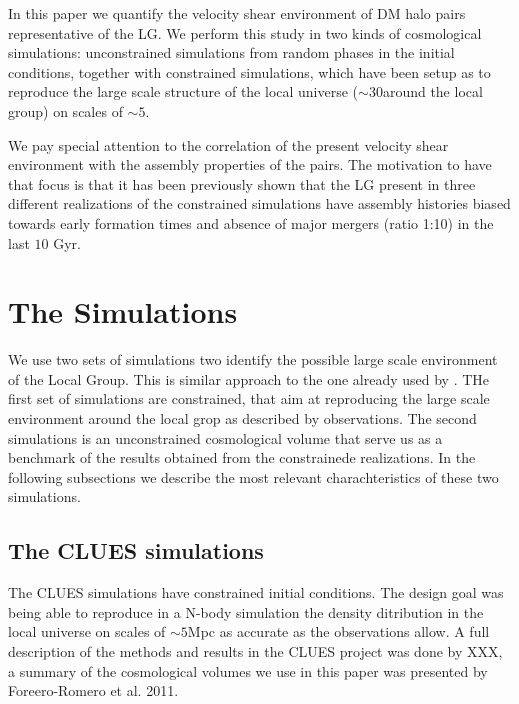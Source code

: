 \documentclass[usenatbib]{mn2e}
\newcommand{\hMpc}{{\ifmmode{h^{-1}{\rm Mpc}}\else{$h^{-1}$Mpc }\fi}}
\begin{document}
In this paper we quantify the velocity shear environment of DM halo pairs representative of the LG. 
We perform this study in two kinds of cosmological simulations: unconstrained simulations from random 
phases in the initial conditions, together with constrained simulations, which have been setup as to 
reproduce the large scale structure of the local universe ($\sim 30$\hMpc around the local group) on 
scales of $\sim 5$\hMpc. 

We pay special attention to the correlation of the present velocity shear environment with the assembly 
properties of the pairs. The motivation to have that focus is that it has been previously shown that 
the LG present in three different realizations of the constrained simulations have assembly histories
biased towards early formation times and absence of major mergers (ratio 1:10) in the last $10$ Gyr.

\section{The Simulations}
\label{sec:the_simulations}

We use two sets of simulations two identify the possible large scale environment of the Local Group. 
This is  similar approach to the one already used by . THe first set of simulations are constrained,
that aim at reproducing the large scale environment around the local grop as described by observations.
The second simulations is an unconstrained cosmological volume that serve us as a benchmark of the 
results obtained from the constrainede realizations. In the following subsections we describe the most 
relevant charachteristics of these two simulations.

\subsection{The CLUES simulations}
\label{subsec:CLUES_simulations}

The CLUES simulations have constrained initial conditions. The design goal was being able to reproduce
in a N-body simulation the density ditribution in the local universe on scales of $\sim5$Mpc as accurate
as the observations allow. A full description of the methods and results in the CLUES project was done
by XXX, a summary  of the cosmological volumes we use in this paper was presented by Foreero-Romero et al. 2011. 
\end{document}
